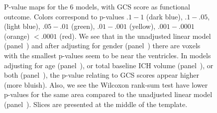 \documentclass[10pt]{article}\usepackage[]{graphicx}\usepackage[]{color}
\begin{document}
\begin{figure}[H]
{ }
  \hfill
  
  \caption{P-value maps for the $6$ models, with GCS score as functional outcome. Colors correspond to p-values $.1-1$ (dark blue), $.1-.05$, (light blue), $.05-.01$ (green), $.01-.001$ (yellow),  $.001-.0001$ (orange) $< .0001$ (red).  We see that in the unadjusted linear model (panel~\protect{}) and after adjusting for gender (panel~\protect{}) there are voxels with the smallest p-values seem to be near the ventricles.  In models adjusting for age (panel~\protect{}), or total baseline ICH volume (panel~\protect{}), or both (panel~\protect{}), the p-value relating to GCS scores appear higher (more bluish).  Also, we see the Wilcoxon rank-sum test have lower p-values for the same area compared to the unadjusted linear model (panel~\protect{}). Slices are presented at the middle of the template.  }
  \label{f:gcsmods}
\end{figure}
\end{document}
